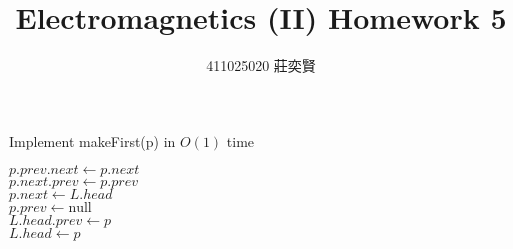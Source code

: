 \documentclass[12pt,a4paper]{article}
\begin{document}
\begin{CJK*}{UTF8}{bsmi}
\title{Electromagnetics (II) Homework 5}
\author{411025020 莊奕賢}
\maketitle

\begin{algorithm}[H]
    \renewcommand{\algorithmcfname}{Function}
    \renewcommand{\thealgocf}{}
    \caption{Implement makeFirst(p) in $O(1)$ time}
    \BlankLine
    $p.prev.next \leftarrow p.next$\\
    $p.next.prev \leftarrow p.prev$\\
    $p.next \leftarrow L.head$\\
    $p.prev \leftarrow \text{null}$\\
    $L.head.prev \leftarrow p$\\
    $L.head \leftarrow p$\\
\end{algorithm}
\end{CJK*}
\end{document}
